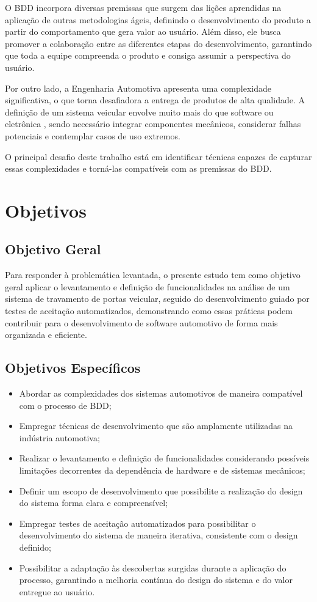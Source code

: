 O BDD incorpora diversas premissas que surgem das lições aprendidas na aplicação de outras metodologias ágeis, definindo o desenvolvimento do produto a partir do 
comportamento que gera valor ao usuário. Além disso, ele busca promover a colaboração entre as diferentes etapas do desenvolvimento, garantindo que toda a equipe 
compreenda o produto e consiga assumir a perspectiva do usuário.

Por outro lado, a Engenharia Automotiva apresenta uma complexidade significativa, o que torna desafiadora a entrega de produtos de alta qualidade. A definição de 
um sistema veicular envolve muito mais do que software ou eletrônica \cite{bosch2022handbook}, sendo necessário integrar componentes mecânicos, considerar falhas 
potenciais e contemplar casos de uso extremos.

O principal desafio deste trabalho está em identificar técnicas capazes de capturar essas complexidades e torná-las compatíveis com as premissas do BDD.

\section{\textbf{Objetivos}}

\subsection{Objetivo Geral}
Para responder à problemática levantada, o presente estudo tem como objetivo geral aplicar o levantamento e definição de funcionalidades na análise de um sistema de 
travamento de portas veicular, seguido do desenvolvimento guiado por testes de aceitação automatizados, demonstrando como essas práticas podem contribuir para o 
desenvolvimento de software automotivo de forma mais organizada e eficiente.

\subsection{Objetivos Específicos}
\begin{itemize}
	\item Abordar as complexidades dos sistemas automotivos de maneira compatível com o processo de BDD;
    \item Empregar técnicas de desenvolvimento que são amplamente utilizadas na indústria automotiva;
    \item Realizar o levantamento e definição de funcionalidades considerando possíveis limitações decorrentes da dependência de hardware e de sistemas mecânicos;
    \item Definir um escopo de desenvolvimento que possibilite a realização do design do sistema forma clara e compreensível;
    \item Empregar testes de aceitação automatizados para possibilitar o desenvolvimento do sistema de maneira iterativa, consistente com o design definido;
    \item Possibilitar a adaptação às descobertas surgidas durante a aplicação do processo, garantindo a melhoria contínua do design do sistema e do valor entregue ao usuário.
\end{itemize}

